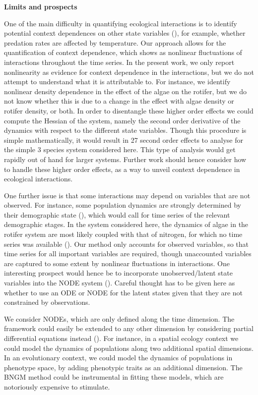 \documentclass[11pt, oneside]{article}
\begin{document}
\textbf{Limits and prospects}

One of the main difficulty in quantifying ecological interactions is to identify potential context dependences on other state variables (\cite{Song2021}), for example, whether predation rates are affected by temperature.
Our approach allows for the quantification of context dependence, which shows as nonlinear fluctuations of interactions throughout the time series.
In the present work, we only report nonlinearity as evidence for context dependence in the interactions, but we do not attempt to understand what it is attributable to.
For instance, we identify nonlinear density dependence in the effect of the algae on the rotifer, but we do not know whether this is due to a change in the effect with algae density or rotifer density, or both. 
In order to disentangle these higher order effects we could compute the Hessian of the system, namely the second order derivative of the dynamics with respect to the different state variables. 
Though this procedure is simple mathematically, it would result in 27 second order effects to analyse for the simple 3 species system considered here.
This type of analysis would get rapidly out of hand for larger systems.
Further work should hence consider how to handle these higher order effects, as a way to unveil context dependence in ecological interactions. 

One further issue is that some interactions may depend on variables that are not observed.
For instance, some population dynamics are strongly determined by their demographic state (\cite{Lande2002,Coulson2004}), which would call for time series of the relevant demographic stages.
In the system considered here, the dynamics of algae in the rotifer system are most likely coupled with that of nitrogen, for which no time series was available (\cite{Hiltunen2013}).
Our method only accounts for observed variables, so that time series for all important variables are required, though unaccounted variables are captured to some extent by nonlinear fluctuations in interactions.
One interesting prospect would hence be to incorporate unobserved/latent state variables into the NODE system (\cite{Dupont2019,Zhang2019,Frank2022}).
Careful thought has to be given here as whether to use an ODE or NODE for the latent states given that they are not constrained by observations. 

We consider NODEs, which are only defined along the time dimension.
The framework could easily be extended to any other dimension by considering partial differential equations instead (\cite{Rackauckas2019}).
For instance, in a spatial ecology context we could model the dynamics of populations along two additional spatial dimensions.
In an evolutionary context, we could model the dynamics of populations in phenotype space, by adding phenotypic traits as an additional dimension.
The BNGM method could be instrumental in fitting these models, which are notoriously expensive to stimulate.
\end{document}
